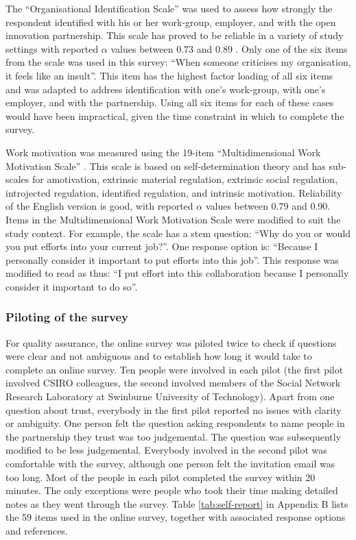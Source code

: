 The \enquote{Organisational Identification Scale} \citep{mael1992alumni} was used to assess how strongly the respondent identified with his or her work\hyp{}group, employer, and with the open innovation partnership. This scale has proved to be reliable in a variety of study settings with reported $\alpha$ values between 0.73 and 0.89 \citep{mael1992alumni,bergami2000self,knippenberg2000foci,van2008interactive}. Only one of the six items from the scale was used in this survey: \enquote{When someone criticises my organisation, it feels like an insult}. This item has the highest factor loading of all six items \citep{mael1992identifying} and was adapted to address identification with one's work-group, with one's employer, and with the partnership. Using all six items for each of these cases would have been impractical, given the time constraint in which to complete the survey. \medskip

Work motivation was measured using the 19-item \enquote{Multidimensional Work Motivation Scale} \citep{gagne2015multidimensional}. This scale is based on self-determination theory and has sub-scales for amotivation, extrinsic material regulation, extrinsic social regulation, introjected regulation, identified regulation, and intrinsic motivation. Reliability of the English version is good, with reported $\alpha$ values between 0.79 and 0.90. Items in the Multidimensional Work Motivation Scale were modified to suit the study context. For example, the scale has a stem question: \enquote{Why do you or would you put efforts into your current job?}. One response option is: \enquote{Because I personally consider it important to put efforts into this job}. This response was modified to read as thus: \enquote{I put effort into this collaboration because I personally consider it important to do so}. 

\subsubsection{Piloting of the survey}

For quality assurance, the online survey was piloted twice to check if questions were clear and not ambiguous and to establish how long it would take to complete an online survey. Ten people were involved in each pilot (the first pilot involved CSIRO colleagues, the second involved members of the Social Network Research Laboratory at Swinburne University of Technology). Apart from one question about trust, everybody in the first pilot reported no issues with clarity or ambiguity. One person felt the question asking respondents to name people in the partnership they trust was too judgemental. The question was subsequently modified to be less judgemental. Everybody involved in the second pilot was comfortable with the survey, although one person felt the invitation email was too long. Most of the people in each pilot completed the survey within 20 minutes. The only exceptions were people who took their time making detailed notes as they went through the survey. Table \ref{tab:self-report} in Appendix B lists the 59 items used in the online survey, together with associated response options and references.

